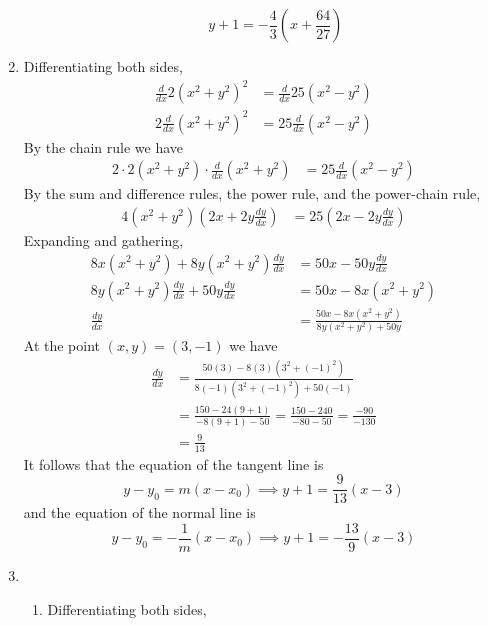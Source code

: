 \documentclass{article}
\begin{document}
\begin{enumerate}
\begin{enumerate}
\begin{equation*}
      y+1 = -\frac{4}{3} \left(x+\frac{64}{27}\right)
    \end{equation*}
  \end{enumerate}
\item %
  Differentiating both sides,
  \begin{align*}
    \frac{d}{dx} 2(x^2+y^2)^2 &= \frac{d}{dx} 25(x^2-y^2) \\
    2 \frac{d}{dx} (x^2+y^2)^2 &= 25 \frac{d}{dx} (x^2-y^2)
  \end{align*}
  By the chain rule we have
  \begin{align*}
    2 \cdot 2(x^2+y^2) \cdot \frac{d}{dx}(x^2+y^2) &= 25 \frac{d}{dx} (x^2-y^2) 
  \end{align*}
  By the sum and difference rules, the power rule, and the power-chain rule,
  \begin{align*}
    4(x^2+y^2) \left(2x + 2y \frac{dy}{dx}\right)
    &= 25 \left(2x-2y \frac{dy}{dx}\right)
  \end{align*}
  Expanding and gathering,
  \begin{align*}
    8x(x^2+y^2) + 8y(x^2+y^2) \frac{dy}{dx} &= 50 x - 50 y \frac{dy}{dx} \\
    8y(x^2+y^2) \frac{dy}{dx} + 50y\frac{dy}{dx} &= 50x - 8x(x^2+y^2) \\
    \frac{dy}{dx} &= \frac{50x-8x(x^2+y^2)}{8y(x^2+y^2) + 50y}
  \end{align*}
  At the point $(x,y)=(3,-1)$ we have
  \begin{align*}
    \frac{dy}{dx} &= \frac{50(3)-8(3)(3^2+(-1)^2)}{8(-1)(3^2+(-1)^2)+50(-1)} \\
                  &= \frac{150 - 24(9+1)}{-8(9+1)-50}
                    = \frac{150-240}{-80-50} = \frac{-90}{-130} \\
                  &= \frac{9}{13}
  \end{align*}
  It follows that the equation of the tangent line is
  \begin{equation*}
    y-y_0 = m (x-x_0) \implies y+1 = \frac{9}{13}(x-3) 
  \end{equation*}
  and the equation of the normal line is
  \begin{equation*}
    y-y_0 = -\frac{1}{m} (x-x_0) \implies y+1 = -\frac{13}{9} (x-3)
  \end{equation*}
\item %
  \begin{enumerate}
  \item Differentiating both sides,
    \begin{equation*}

\end{equation*}
\end{enumerate}
\end{enumerate}
\end{document}
